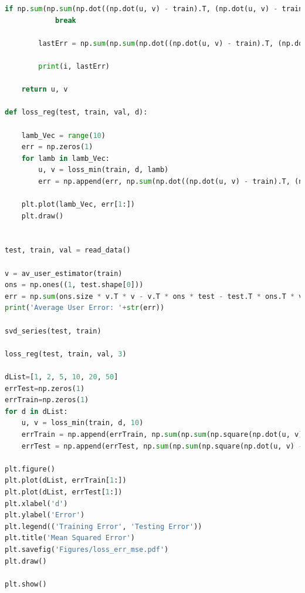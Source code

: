 \documentclass{article}
\newcommand{\1}{\mathbf{1}}
\begin{document}
\begin{enumerate}
\begin{lstlisting}[language=Python]
        if np.sum(np.sum(np.dot((np.dot(u, v) - train).T, (np.dot(u, v) - train)))) > lastErr:
            break

        lastErr = np.sum(np.sum(np.dot((np.dot(u, v) - train).T, (np.dot(u, v) - train))))

        print(i, lastErr)

    return u, v

def loss_reg(test, train, val, d):

    lamb_Vec = range(10)
    err = np.zeros(1)
    for lamb in lamb_Vec:
        u, v = loss_min(train, d, lamb)
        err = np.append(err, np.sum(np.dot((np.dot(u, v) - train).T, (np.dot(u, v) - train))))

    plt.plot(lamb_Vec, err[1:])
    plt.draw()


test, train, val = read_data()

v = av_user_estimator(train)
ons = np.ones((1, test.shape[0]))
err = np.sum(ons.size * v.T * v - v.T * ons * test - test.T * ons.T * v + test.T * test) / test.nnz
print('Average User Error: '+str(err))

svd_series(test, train)

loss_reg(test, train, val, 3)

dList=[1, 2, 5, 10, 20, 50]
errTest=np.zeros(1)
errTrain=np.zeros(1)
for d in dList:
    u, v = loss_min(train, d, 10)
    errTrain = np.append(errTrain, np.sum(np.sum(np.square(np.dot(u, v) - train)))/train.nnz)
    errTest = np.append(errTest, np.sum(np.sum(np.square(np.dot(u, v) - test)))/test.nnz)

plt.figure()
plt.plot(dList, errTrain[1:])
plt.plot(dList, errTest[1:])
plt.xlabel('d')
plt.ylabel('Error')
plt.legend(('Training Error', 'Testing Error'))
plt.title('Mean Squared Error')
plt.savefig('Figures/loss_err_mse.pdf')
plt.draw()

plt.show()

\end{lstlisting}

\end{enumerate}
\end{document}
